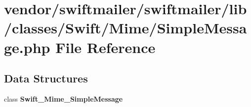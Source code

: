 \section{vendor/swiftmailer/swiftmailer/lib/classes/\+Swift/\+Mime/\+Simple\+Message.php File Reference}
\label{_simple_message_8php}
\subsection*{Data Structures}
\begin{DoxyCompactItemize}
\item 
class {\bf Swift\+\_\+\+Mime\+\_\+\+Simple\+Message}
\end{DoxyCompactItemize}
